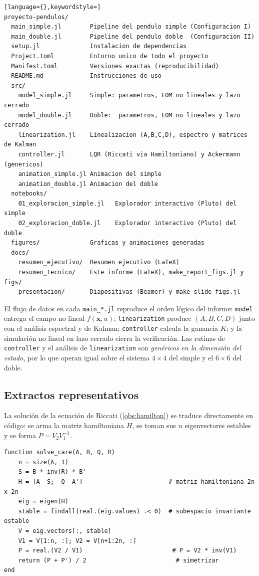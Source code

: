 \documentclass[11pt,letterpaper]{article}
\theoremstyle{definition}
\theoremstyle{plain}
\theoremstyle{remark}
\newcommand{\xv}{\bm{x}}
\begin{document}
\begin{lstlisting}[language={},keywordstyle=]
proyecto-pendulos/
  main_simple.jl        Pipeline del pendulo simple (Configuracion I)
  main_double.jl        Pipeline del pendulo doble  (Configuracion II)
  setup.jl              Instalacion de dependencias
  Project.toml          Entorno unico de todo el proyecto
  Manifest.toml         Versiones exactas (reproducibilidad)
  README.md             Instrucciones de uso
  src/
    model_simple.jl     Simple: parametros, EOM no lineales y lazo cerrado
    model_double.jl     Doble:  parametros, EOM no lineales y lazo cerrado
    linearization.jl    Linealizacion (A,B,C,D), espectro y matrices de Kalman
    controller.jl       LQR (Riccati via Hamiltoniano) y Ackermann (genericos)
    animation_simple.jl Animacion del simple
    animation_double.jl Animacion del doble
  notebooks/
    01_exploracion_simple.jl   Explorador interactivo (Pluto) del simple
    02_exploracion_doble.jl    Explorador interactivo (Pluto) del doble
  figures/              Graficas y animaciones generadas
  docs/
    resumen_ejecutivo/  Resumen ejecutivo (LaTeX)
    resumen_tecnico/    Este informe (LaTeX), make_report_figs.jl y figs/
    presentacion/       Diapositivas (Beamer) y make_slide_figs.jl
\end{lstlisting}

El flujo de datos en cada \texttt{main\_*.jl} reproduce el orden lógico del
informe: \texttt{model} entrega el campo no lineal $f(\xv,u)$;
\texttt{linearization} produce $(A,B,C,D)$ junto con el análisis espectral y de
Kalman; \texttt{controller} calcula la ganancia $K$; y la simulación no lineal
en lazo cerrado cierra la verificación. Las rutinas de \texttt{controller} y el
análisis de \texttt{linearization} son \emph{genéricos en la dimensión del
estado}, por lo que operan igual sobre el sistema $4\times4$ del simple y el
$6\times6$ del doble.

\subsection*{Extractos representativos}

La solución de la ecuación de Riccati (\cref{obs:hamilton}) se traduce
directamente en código: se arma la matriz hamiltoniana $H$, se toman sus $n$
eigenvectores estables y se forma $P=V_2V_1^{-1}$.

\begin{lstlisting}
function solve_care(A, B, Q, R)
    n = size(A, 1)
    S = B * inv(R) * B'
    H = [A -S; -Q -A']                        # matriz hamiltoniana 2n x 2n
    eig = eigen(H)
    stable = findall(real.(eig.values) .< 0)  # subespacio invariante estable
    V = eig.vectors[:, stable]
    V1 = V[1:n, :]; V2 = V[n+1:2n, :]
    P = real.(V2 / V1)                         # P = V2 * inv(V1)
    return (P + P') / 2                         # simetrizar
end
\end{lstlisting}
\end{document}
